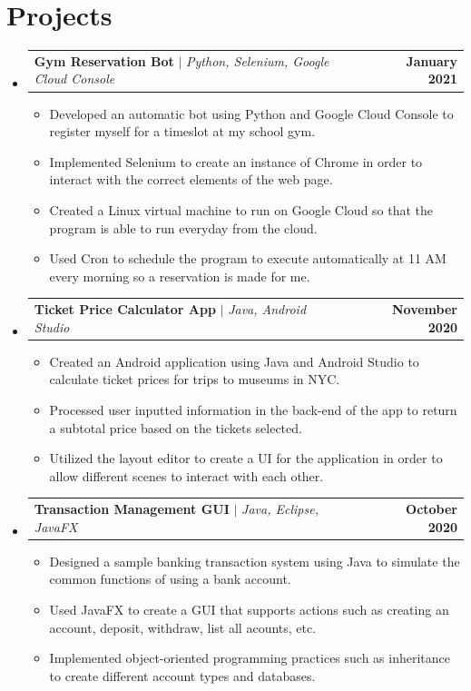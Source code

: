 \documentclass[letterpaper,11pt]{article}
\makeatletter
\newcommand{\resumeItem}[1]{
  \item\small{
    {#1 \vspace{-2pt}}
  }
}
\newcommand{\resumeProjectHeading}[2]{
    \item
    \begin{tabular*}{1.001\textwidth}{l@{\extracolsep{\fill}}r}
      \small#1 & \textbf{\small #2}\\
    \end{tabular*}\vspace{-7pt}
}
\newcommand{\resumeSubHeadingListStart}{\begin{itemize}[leftmargin=0.0in, label={}]}
\newcommand{\resumeSubHeadingListEnd}{\end{itemize}}
\newcommand{\resumeItemListStart}{\begin{itemize}}
\newcommand{\resumeItemListEnd}{\end{itemize}\vspace{-5pt}}
\makeatother
\begin{document}
\section{Projects}
    \vspace{-5pt}
    \resumeSubHeadingListStart
      \resumeProjectHeading
          {\textbf{Gym Reservation Bot} $|$ \emph{Python, Selenium, Google Cloud Console}}{January 2021}
          \resumeItemListStart
            \resumeItem{Developed an automatic bot using Python and Google Cloud Console to register myself for a timeslot at my school gym.}
            \resumeItem{Implemented Selenium to create an instance of Chrome in order to interact with the correct elements of the web page.}
            \resumeItem{Created a Linux virtual machine to run on Google Cloud so that the program is able to run everyday from the cloud.}
            \resumeItem{Used Cron to schedule the program to execute automatically at 11 AM every morning so a reservation is made for me.}
          \resumeItemListEnd
          \vspace{-13pt}
      \resumeProjectHeading
          {\textbf{Ticket Price Calculator App} $|$ \emph{Java, Android Studio}}{November 2020}
          \resumeItemListStart
            \resumeItem{Created an Android application using Java and Android Studio to calculate ticket prices for trips to museums in NYC.}
            \resumeItem{Processed user inputted information in the back-end of the app to return a subtotal price based on the tickets selected.}
            \resumeItem{Utilized the layout editor to create a UI for the application in order to allow different scenes to interact with each other.}
          \resumeItemListEnd 
          \vspace{-13pt}
          \resumeProjectHeading
          {\textbf{Transaction Management GUI} $|$ \emph{Java, Eclipse, JavaFX}}{October 2020}
          \resumeItemListStart
            \resumeItem{Designed a sample banking transaction system using Java to simulate the common functions of using a bank account.}
            \resumeItem{Used JavaFX to create a GUI that supports actions such as creating an account, deposit, withdraw, list all acounts, etc.}
            \resumeItem{Implemented object-oriented programming practices such as inheritance to create different account types and databases.}
          \resumeItemListEnd 
    \resumeSubHeadingListEnd
\vspace{-15pt}


%
\end{document}
